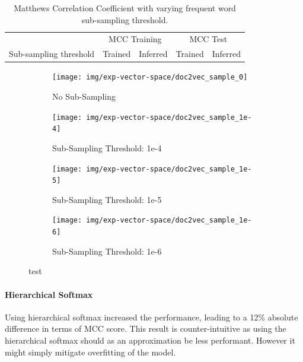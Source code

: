 \begin{table}[h]
  \begin{center}
    \begin{tabular}{ c | *2c | *2c }
      \toprule
       & \multicolumn{2}{c|}{MCC Training} & \multicolumn{2}{|c}{MCC Test}\\
      Sub-sampling threshold & Trained & Inferred & Trained & Inferred \\
      \midrule

    \bottomrule
  \end{tabular}
  \caption{Matthews Correlation Coefficient with varying frequent word sub-sampling threshold.}
\label{tab:Paragraph Vector Parameter Results Sample}
\end{center}
\end{table}

\begin{figure}[h!]
    \centering
    \begin{subfigure}[b]{0.49\textwidth}
      \texttt{[image: img/exp-vector-space/doc2vec\_sample\_0]}
      \caption{No Sub-Sampling}
\label{fig:doc2vec_sample_0}
    \end{subfigure}
    \begin{subfigure}[b]{0.49\textwidth}
      \texttt{[image: img/exp-vector-space/doc2vec\_sample\_1e-4]}
    \caption{Sub-Sampling Threshold: 1e-4}
\label{fig:doc2vec_vector_size_1e-4}
    \end{subfigure}
    \begin{subfigure}[b]{0.49\textwidth}
      \texttt{[image: img/exp-vector-space/doc2vec\_sample\_1e-5]}
      \caption{Sub-Sampling Threshold: 1e-5}
\label{fig:doc2vec_vector_size_1e-5}
  \end{subfigure}
  \begin{subfigure}[b]{0.49\textwidth}
    \texttt{[image: img/exp-vector-space/doc2vec\_sample\_1e-6]}
    \caption{Sub-Sampling Threshold: 1e-6}
\label{fig:doc2vec_sample_1e-6}
  \end{subfigure}
\caption{test}
\label{fig:doc2vec_sample}
\end{figure}

\paragraph{Hierarchical Softmax}
Using hierarchical softmax increased the performance, leading to a 12\% absolute difference in terms of MCC score. This result is counter-intuitive as using the hierarchical softmax should as an approximation be less performant. However it might simply mitigate overfitting of the model.

